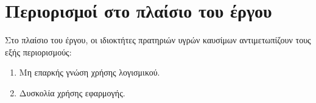 \section{Περιορισμοί στο πλαίσιο του έργου}

Στο πλαίσιο του έργου, οι ιδιοκτήτες πρατηριών υγρών καυσίμων αντιμετωπίζουν τους εξής περιορισμούς:
\begin{enumerate}
	\item Μη επαρκής γνώση χρήσης λογισμικού.
	\item Δυσκολία χρήσης εφαρμογής.
\end{enumerate}
